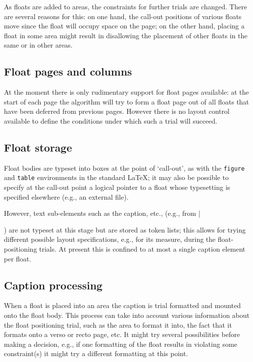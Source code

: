 \documentclass[twocolumn]{article}
\begin{document}
As floats are added to areas, the constraints for further trials 
are changed. There are several reasons for this:
on one hand, the call-out positions of
various floats move
since the float will occupy space on the page; on the other hand,
placing a float in some area might result in disallowing the placement
of other floats in the same or in other areas.


\subsection{Float pages and columns}

At the moment there is only rudimentary support for float pages
available: at the start of each page the algorithm will try to form a
float page out of all floats that have been deferred from previous
pages. However there is no layout control available to define the
conditions under which such a trial will succeed.


\subsection{Float storage}

Float bodies are typeset into boxes at the point of `call-out', as
with the \texttt{figure} and \texttt{table} environments in the standard
\LaTeX; it may also be possible to specify at the call-out point a
logical pointer to a float whose typesetting is specified elsewhere
(e.g., an external file).

However, text sub-elements such as the caption, etc., (e.g., from
|\caption|) are not typeset at this stage but are stored as token
lists; this allows for trying different possible layout specifications,
e.g., for its measure, during the float-positioning trials.  At present
this is confined to at most a single caption element per float.

\subsection{Caption processing}

When a float is placed into an area the caption is trial formatted and
mounted onto the float body. This process can take into account
various information about the float positioning trial, such as the
area to format it into, the fact that it formats onto a verso or recto
page, etc. It might try several possibilities before making a decision,
e.g., if one formatting of the float results in violating some
constraint(s) it might try a different formatting at 
this point.
\end{document}
